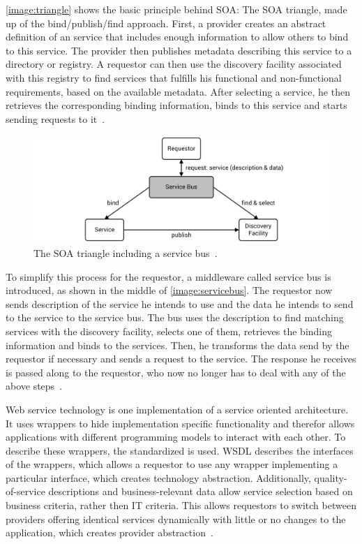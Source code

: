 \autoref{image:triangle} shows the basic principle behind SOA: The SOA triangle, made up of the bind/publish/find approach.
First, a provider creates an abstract definition of an service that includes enough information to allow others to bind to this service.
The provider then publishes metadata describing this service to a directory or registry.
A requestor can then use the discovery facility associated with this registry to find services that fulfills his functional and non-functional requirements, based on the available metadata.
After selecting a service, he then retrieves the corresponding binding information, binds to this service and starts sending requests to it~\autocite{webservices}.

\begin{figure}[!htbp]
	\centering
	\includegraphics[resolution=600]{fundamentals/assets/service_bus}
	\caption{The SOA triangle including a service bus~\autocite[based on][]{webservices}.}
	\label{image:servicebus}
\end{figure}

To simplify this process for the requestor, a middleware called service bus is introduced, as shown in the middle of \autoref{image:servicebus}.
The requestor now sends description of the service he intends to use and the data he intends to send to the service to the service bus.
The bus uses the description to find matching services with the discovery facility, selects one of them, retrieves the binding information and binds to the services.
Then, he transforms the data send by the requestor if necessary and sends a request to the service.
The response he receives is passed along to the requestor, who now no longer has to deal with any of the above steps~\autocite{webservices}.

Web service technology is one implementation of a service oriented architecture.
It uses wrappers to hide implementation specific functionality and therefor allows applications with different programming models to interact with each other.
To describe these wrappers, the standardized  is used.
WSDL describes the interfaces of the wrappers, which allows a requestor to use any wrapper implementing a particular interface, which creates technology abstraction.
Additionally, quality-of-service descriptions and business-relevant data allow service selection based on business criteria, rather then IT criteria.
This allows requestors to switch between providers offering identical services dynamically with little or no changes to the application, which creates provider abstraction~\autocite{webservices}.

